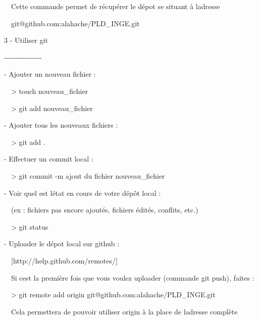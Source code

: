 \documentclass{mise_en_page}
\begin{document}
\ \ Cette commande permet de récupérer le dépot se situant à
l{\textquotesingle}adresse

\ \ git@github.com:alahache/PLD\_INGE.git










3 - Utiliser git

{}-{}-{}-{}-{}-{}-{}-{}-{}-{}-{}-{}-{}-{}-{}-{}-




{}- Ajouter un nouveau fichier :

\ \ {\textgreater} touch nouveau\_fichier

\ \ {\textgreater} git add nouveau\_fichier







{}- Ajouter tous les nouveaux fichiers :

\ \ {\textgreater} git add .







{}- Effectuer un commit local :

\ \ {\textgreater} git commit -m {\textquotedbl}ajout du fichier
nouveau\_fichier{\textquotedbl}







{}- Voir quel est l{\textquotesingle}état en cours de votre dépôt local
:

\ \ (ex : fichiers pas encore ajoutés, fichiers édités, conflits, etc.)

\ \ {\textgreater} git status







{}- Uploader le dépot local sur github :

\ \ [http://help.github.com/remotes/]

\ \ Si c{\textquotesingle}est la première fois que vous voulez uploader
(commande git push), faites :

\ \ {\textgreater} git remote add origin
git@github.com:alahache/PLD\_INGE.git




\ \ Cela permettera de pouvoir utiliser
{\textquotedbl}origin{\textquotedbl} à la place de
l{\textquotesingle}adresse complète
\end{document}
